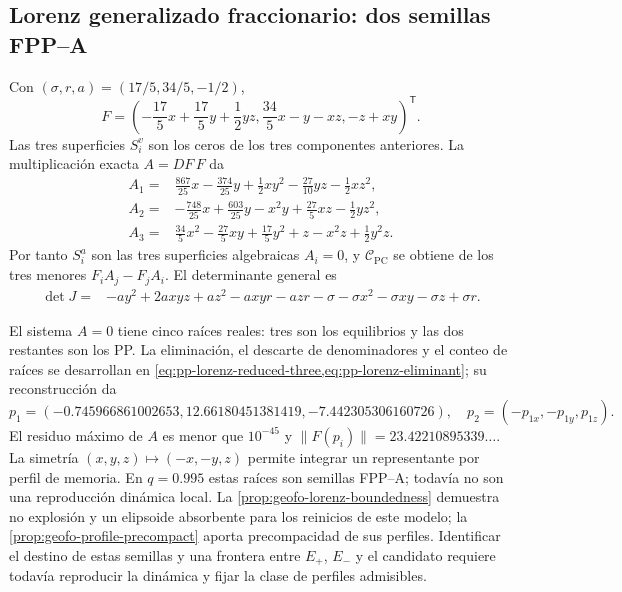 \subsection{Lorenz generalizado fraccionario: dos semillas FPP--A}
\label{subsec:casegt-lorenz}

Con $(\sigma,r,a)=(17/5,34/5,-1/2)$,
\begin{equation}
 F=\left(
 -\frac{17}{5}x+\frac{17}{5}y+\frac12yz,
 \frac{34}{5}x-y-xz,
 -z+xy
 \right)^{\mathsf T}.
 \label{casegt:eq:lorenz-field}
\end{equation}
Las tres superficies $S_i^v$ son los ceros de los tres componentes anteriores.
La multiplicación exacta $A=DF\,F$ da
\begin{align}
 A_1={}&\frac{867}{25}x-\frac{374}{25}y+\frac{1}{2}xy^2
 -\frac{27}{10}yz-\frac12xz^2,\nonumber\\
 A_2={}&-\frac{748}{25}x+\frac{603}{25}y-x^2y
 +\frac{27}{5}xz-\frac12yz^2,\\
 A_3={}&\frac{34}{5}x^2-\frac{27}{5}xy+\frac{17}{5}y^2
 +z-x^2z+\frac12y^2z.
 \label{casegt:eq:lorenz-A}
\end{align}
Por tanto $S_i^a$ son las tres superficies algebraicas
$A_i=0$, y $\mathcal C_{\mathrm{PC}}$ se obtiene de los tres menores
$F_iA_j-F_jA_i$. El determinante general es
\begin{align}
 \det J={}&-ay^2+2axyz+az^2-axyr-azr-\sigma
 -\sigma x^2-\sigma xy-\sigma z+\sigma r.
 \label{casegt:eq:lorenz-det}
\end{align}

El sistema $A=0$ tiene cinco raíces reales: tres son los equilibrios y las dos restantes
son los PP. La eliminación, el descarte de denominadores y el conteo de
raíces se desarrollan en \cref{eq:pp-lorenz-reduced-three,eq:pp-lorenz-eliminant};
su reconstrucción da
\begin{equation}
 p_1=(-0.745966861002653,12.66180451381419,-7.442305306160726),
 \quad
 p_2=(-p_{1x},-p_{1y},p_{1z}).
 \label{casegt:eq:lorenz-PP}
\end{equation}
El residuo máximo de $A$ es menor que $10^{-45}$ y
$\lVert F(p_i)\rVert=23.42210895339\ldots$. La simetría
$(x,y,z)\mapsto(-x,-y,z)$ permite integrar un representante por perfil de
memoria. En $q=0.995$ estas raíces son semillas FPP--A; todavía no son una
reproducción dinámica local. La \cref{prop:geofo-lorenz-boundedness} demuestra
no explosión y un elipsoide absorbente para los reinicios de este modelo; la
\cref{prop:geofo-profile-precompact} aporta precompacidad de sus perfiles.
Identificar el destino de estas semillas y una frontera entre $E_+$, $E_-$ y
el candidato requiere todavía reproducir la dinámica y fijar la clase de
perfiles admisibles.

